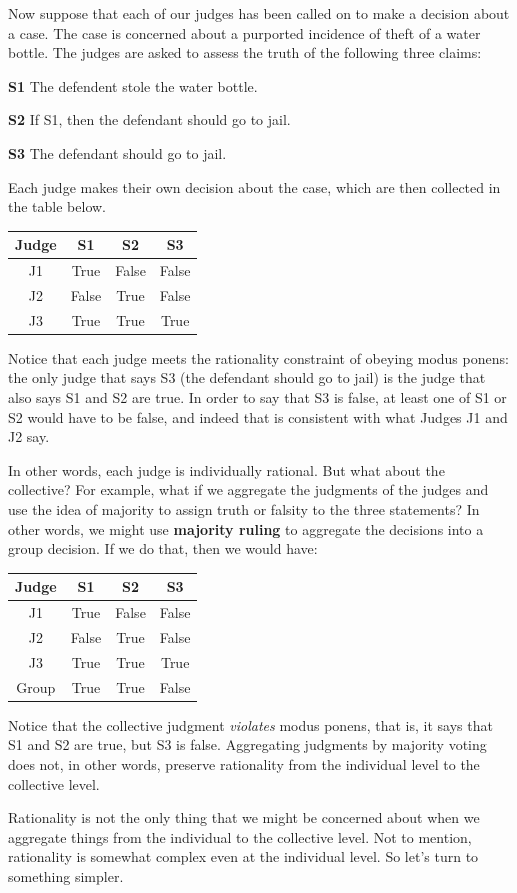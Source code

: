 \documentclass[]{tufte-book}
\begin{document}
Now suppose that each of our judges has been called on to make a decision about a case. The case is concerned about a purported incidence of theft of a water bottle. The judges are asked to assess the truth of the following three claims:

\textbf{S1} The defendent stole the water bottle.

\textbf{S2} If S1, then the defendant should go to jail.

\textbf{S3} The defendant should go to jail.

Each judge makes their own decision about the case, which are then collected in the table below.

\begin{longtable}[]{@{}cccc@{}}
\toprule
Judge & S1 & S2 & S3\tabularnewline
\midrule
\endhead
J1 & True & False & False\tabularnewline
J2 & False & True & False\tabularnewline
J3 & True & True & True\tabularnewline
\bottomrule
\end{longtable}

Notice that each judge meets the rationality constraint of obeying modus ponens: the only judge that says S3 (the defendant should go to jail) is the judge that also says S1 and S2 are true. In order to say that S3 is false, at least one of S1 or S2 would have to be false, and indeed that is consistent with what Judges J1 and J2 say.

In other words, each judge is individually rational. But what about the collective? For example, what if we aggregate the judgments of the judges and use the idea of majority to assign truth or falsity to the three statements? In other words, we might use \textbf{majority ruling} to aggregate the decisions into a group decision. If we do that, then we would have:

\begin{longtable}[]{@{}cccc@{}}
\toprule
Judge & S1 & S2 & S3\tabularnewline
\midrule
\endhead
J1 & True & False & False\tabularnewline
J2 & False & True & False\tabularnewline
J3 & True & True & True\tabularnewline
Group & True & True & False\tabularnewline
\bottomrule
\end{longtable}

Notice that the collective judgment \emph{violates} modus ponens, that is, it says that S1 and S2 are true, but S3 is false. Aggregating judgments by majority voting does not, in other words, preserve rationality from the individual level to the collective level.

Rationality is not the only thing that we might be concerned about when we aggregate things from the individual to the collective level. Not to mention, rationality is somewhat complex even at the individual level. So let's turn to something simpler.
\end{document}
